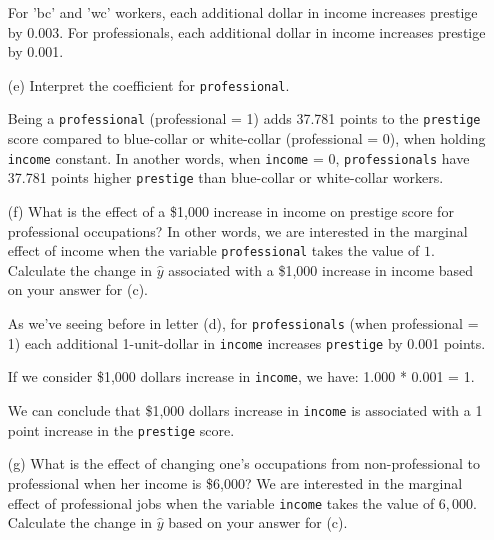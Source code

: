 \documentclass[12pt,letterpaper]{article}
\begin{document}
\begin{enumerate}
		For 'bc' and 'wc' workers, each additional dollar in income increases prestige by 0.003.
		For professionals, each additional dollar in income increases prestige by 0.001.
	\vspace{1.5cm}
	
	

	\item [(e)]
	Interpret the coefficient for \texttt{professional}.
	\vspace{.2cm}
	
		Being a \texttt{professional} (professional = 1) adds 37.781 points to the \texttt{prestige} score compared to blue-collar or white-collar (professional = 0), when holding \texttt{income} constant.	In another words, when \texttt{income} = 0, \texttt{professionals} have 37.781 points higher \texttt{prestige} than blue-collar or white-collar workers.
	\vspace{1.5cm}
	
	
	
	\item [(f)]
	What is the effect of a \$1,000 increase in income on prestige score for professional occupations? In other words, we are interested in the marginal effect of income when the variable \texttt{professional} takes the value of $1$. Calculate the change in $\hat{y}$ associated with a \$1,000 increase in income based on your answer for (c).
	\vspace{.5cm}

		As we've seeing before in letter (d), for \texttt{professionals} (when professional = 1) each additional 1-unit-dollar in \texttt{income} increases \texttt{prestige} by 0.001 points.  
		
		If we consider \$1,000 dollars increase in \texttt{income}, we have: 1.000 * 0.001 = 1. 
		
		We can conclude that \$1,000 dollars  increase in \texttt{income} is associated with a 1 point increase in the \texttt{prestige} score.
	
	\vspace{.5cm}
	
	\newpage
	
	
	\item [(g)]
	What is the effect of changing one's occupations from non-professional to professional when her income is \$6,000? We are interested in the marginal effect of professional jobs when the variable \texttt{income} takes the value of $6,000$. Calculate the change in $\hat{y}$ based on your answer for (c).
	\vspace{.6cm}
	

\end{enumerate}
\end{document}
